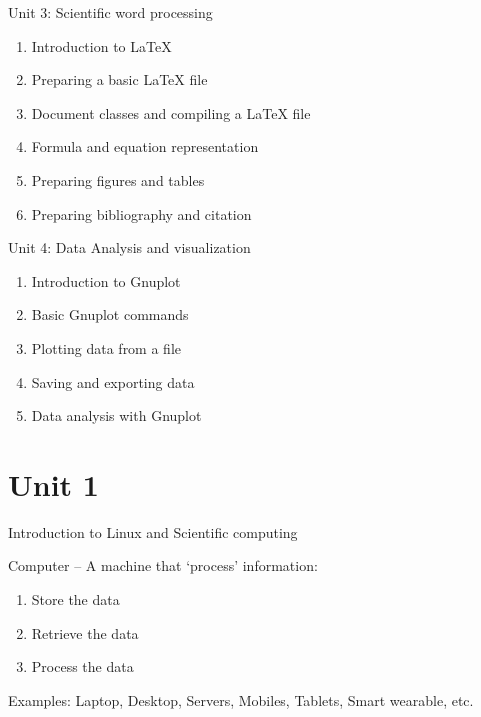 \documentclass[aspectratio=169]{beamer}
\begin{document}
\begin{frame}{Unit 3: Scientific word processing}

   \begin{enumerate}
       \item Introduction to {\LaTeX}
       \item Preparing a basic {\LaTeX} file
       \item Document classes and compiling a {\LaTeX} file
       \item Formula and equation representation
       \item Preparing figures and tables
       \item Preparing bibliography and citation 
   \end{enumerate}

\end{frame}


\begin{frame}{Unit 4: Data Analysis and visualization}

\begin{enumerate}
    \item Introduction to Gnuplot
    \item Basic Gnuplot commands 
    \item Plotting data from a file
    \item Saving and exporting data
    \item Data analysis with Gnuplot
\end{enumerate}
\end{frame}




\section{Unit 1}
\begin{frame}{Introduction to Linux and Scientific computing}
    \begin{block}{Computer}
        -- A machine that `process' information:
    \end{block}

    \begin{enumerate}
        \item Store the data
        \item Retrieve the data
        \item Process the data
    \end{enumerate}

    \vskip1cm

    Examples: Laptop, Desktop, Servers, Mobiles, Tablets, Smart wearable, etc. 
\end{frame}
\end{document}
